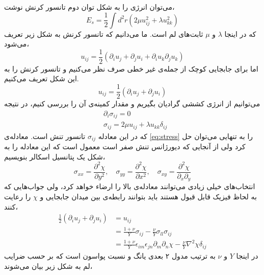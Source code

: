 می‌توان انرژی را به شکل توان دوم تانسور کرنش نوشت،
\begin{equation}
E_s=\frac{1}{2}\int d^2r(2\mu u_{ij}^2+\lambda u_{kk}^2)
\label{eq:energylame}
\end{equation}
که در اینجا $\lambda$
و $\mu$
ثابت‌های لم
است. ما می‌دانیم که تانسور کرنش به شکل زیر تعریف می‌شود،
\begin{equation}
u_{ij}=\frac{1}{2}(\partial_i u_j+\partial_j u_i+\partial_i u_k\partial_j u_k)
\end{equation}
اما برای جابجایی کوچک از جمله‌ی غیر خطی صرف نظر می‌کنیم و تانسور کرنش را به این شکل تعریف می‌کنیم.
\begin{equation}
u_{ij}=\frac{1}{2}(\partial_i u_j+\partial_j u_i)
\end{equation}
می‌توانیم  از انرژی کششی گرادیان بگیریم و مقدار کمینه‌ی آن را بررسی کنیم، در نتیجه
\begin{equation}
\begin{aligned}
&\partial_i\sigma_{ij}=0\\
&\sigma_{ij}=2\mu u_{ij}+\lambda u_{kk}\delta_{ij}
\label{eq:stress}
\end{aligned}
\end{equation}
که در این معادله 
$\sigma_{ij}$
تانسور تنش است. معادله‌ی 
\ref{eq:stress}
را به تنهایی می‌توان حل کرد ولی از آنجایی که دیورژانس تنش صفر است معمول است که این معادله را به شکل یک پتانسیل اسکالر بنویسیم،
\begin{equation}
\sigma_{xx}=\frac{\partial^2\chi}{\partial y^2},\quad\sigma_{yy}=\frac{\partial^2\chi}{\partial x^2},\quad\sigma_{xy}=\frac{\partial^2\chi}{\partial_x\partial_y} 
\end{equation}
انتخاب‌های خیلی زیادی می‌توانند معادله‌ی بالا را ارضاء خواهد کرد، ولی جواب‌هایی که به لحاظ فیزیک قابل قبول هستند باید بتوانند رابطه‌ی بین میدان جابجایی و 
$\chi$
را رعایت کنند،
\begin{equation}
\begin{aligned}
\frac{1}{2}(\partial_iu_j+\partial_ju_i)&=u_{ij}\\
&=\frac{1+\nu}{Y}\sigma_{ij}-\frac{\nu}{Y}\sigma_{ll}\sigma_{ij}\\
&=\frac{1+\nu}{Y}\epsilon_{im}\epsilon_{jn}\partial_{m}\partial_{n}\chi-\frac{\nu}{Y}\nabla^2\chi\delta_{ij}
\label{eq:constraint}
\end{aligned}
\end{equation}
در اینجا $Y$
و $\nu$
به ترتیب مدول ۲ بعدی یانگ
 و نسبت پواسون
است که بر حسب ضرایب لم به شکل زیر بیان می‌شوند،
